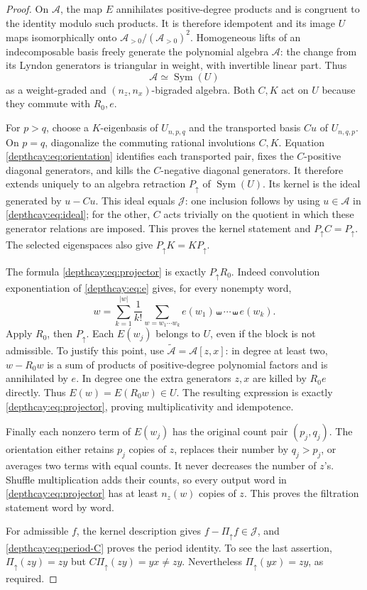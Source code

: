 \begin{proof}
On $\mathcal A$, the map $E$ annihilates positive-degree products and
is congruent to the identity modulo such products. It is therefore
idempotent and its image $U$ maps isomorphically onto
$\mathcal A_{>0}/(\mathcal A_{>0})^2$. Homogeneous lifts of an
indecomposable basis freely generate the polynomial algebra
$\mathcal A$: the change from its Lyndon generators is triangular in
weight, with invertible linear part. Thus
\begin{equation}\label{depthcay:eq:SymU}
 \mathcal A\simeq\operatorname{Sym}(U)
\end{equation}
as a weight-graded and $(n_z,n_x)$-bigraded algebra. Both $C,K$ act
on $U$ because they commute with $R_0,e$.

For $p>q$, choose a $K$-eigenbasis of $U_{n,p,q}$ and the transported
basis $Cu$ of $U_{n,q,p}$. On $p=q$, diagonalize the commuting rational
involutions $C,K$. Equation \eqref{depthcay:eq:orientation} identifies
each transported pair, fixes the $C$-positive diagonal generators,
and kills the $C$-negative diagonal generators. It therefore extends
uniquely to an algebra retraction $P_{\uparrow}$ of
$\operatorname{Sym}(U)$. Its kernel is the ideal generated by
$u-Cu$. This ideal equals $\mathcal J$: one inclusion follows by
using $u\in\mathcal A$ in \eqref{depthcay:eq:ideal}; for the other,
$C$ acts trivially on the quotient in which these generator relations
are imposed. This proves the kernel statement and
$P_{\uparrow}C=P_{\uparrow}$. The selected eigenspaces also give
$P_{\uparrow}K=KP_{\uparrow}$.

The formula \eqref{depthcay:eq:projector} is exactly
$P_{\uparrow}R_0$. Indeed convolution exponentiation of
\eqref{depthcay:eq:e} gives, for every nonempty word,
\[
 w=\sum_{k=1}^{|w|}\frac1{k!}
 \sum_{w=w_1\cdots w_k}e(w_1)\shuffle\cdots\shuffle e(w_k).
\]
Apply $R_0$, then $P_{\uparrow}$. Each $E(w_j)$ belongs to $U$,
even if the block is not admissible. To justify this point, use
$\widetilde{\mathcal A}=\mathcal A[z,x]$: in degree at least two,
$w-R_0w$ is a sum of products of positive-degree polynomial factors
and is annihilated by $e$. In degree one the extra generators $z,x$
are killed by $R_0e$ directly. Thus $E(w)=E(R_0w)\in U$.
The resulting expression is exactly \eqref{depthcay:eq:projector},
proving multiplicativity and idempotence.

Finally each nonzero term of $E(w_j)$ has the original count pair
$(p_j,q_j)$. The orientation either retains $p_j$ copies of $z$,
replaces their number by $q_j>p_j$, or averages two terms with equal
counts. It never decreases the number of $z$'s. Shuffle multiplication
adds their counts, so every output word in
\eqref{depthcay:eq:projector} has at least $n_z(w)$ copies of $z$.
This proves the filtration statement word by word.

For admissible $f$, the kernel description gives
$f-\Pi_{\uparrow}f\in\mathcal J$, and
\eqref{depthcay:eq:period-C} proves the period identity.
To see the last assertion, $\Pi_{\uparrow}(zy)=zy$ but
$C\Pi_{\uparrow}(zy)=yx\ne zy$. Nevertheless
$\Pi_{\uparrow}(yx)=zy$, as required.
\end{proof}

